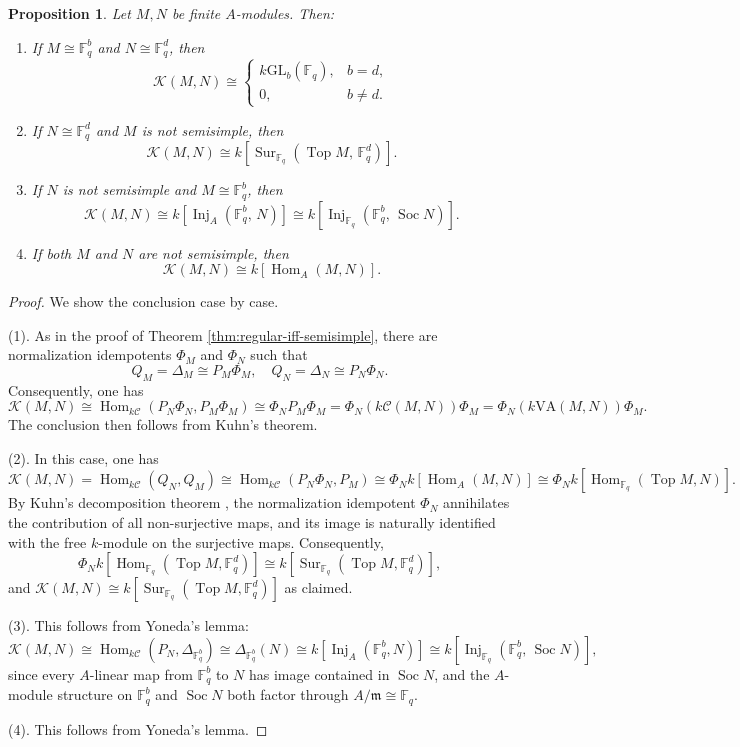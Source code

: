 \documentclass[10pt, reqno]{amsart}
\theoremstyle{plain}
\newtheorem{proposition}[theorem]{Proposition}
\numberwithin{equation}{section}
\theoremstyle{definition}
\newcommand{\Hom}{\operatorname{Hom}}
\newcommand{\Inj}{\operatorname{Inj}}
\newcommand{\Sur}{\operatorname{Sur}}
\newcommand{\Soc}{\operatorname{Soc}}
\newcommand{\Top}{\operatorname{Top}}
\newcommand{\C}{\mathscr C}
\newcommand{\K}{\mathcal K}
\begin{document}
\begin{proposition}\label{prop:four-blocks}
Let $M, N$ be finite $A$-modules. Then:
\begin{enumerate}
\item If $M \cong \mathbb{F}_q^b$ and $N \cong \mathbb{F}_q^d$, then
\[
\K(M, N) \cong
\begin{cases}
k\mathrm{GL}_b(\mathbb{F}_q),& b = d,\\
0, & b \neq d.
\end{cases}
\]
\item If $N \cong \mathbb{F}_q^d$ and $M$ is not semisimple, then
\[
\K(M, N) \cong k[\Sur_{\mathbb{F}_q} (\Top M, \, \mathbb{F}_q^d)].
\]
\item If $N$ is not semisimple and $M \cong \mathbb{F}_q^b$, then
\[
\K(M, N) \cong k[\Inj_A(\mathbb{F}_q^b, \, N)] \cong k[\Inj_{\mathbb{F}_q} (\mathbb{F}_q^b, \, \Soc N)].
\]
\item If both $M$ and $N$ are not semisimple, then
\[
\K(M, N) \cong k[\Hom_A(M, N)].
\]
\end{enumerate}
\end{proposition}

\begin{proof}
We show the conclusion case by case.

\medskip
\noindent
(1). As in the proof of Theorem \ref{thm:regular-iff-semisimple}, there are normalization idempotents $\Phi_M$ and $\Phi_N$ such that
\[
Q_M = \Delta_M \cong P_M \Phi_M, \quad Q_N = \Delta_N \cong P_N \Phi_N.
\]
Consequently, one has
\[
\K(M, N) \cong \Hom_{k\C} (P_N \Phi_N, P_M \Phi_M) \cong \Phi_N P_M \Phi_M = \Phi_N (k\C(M, N)) \Phi_M = \Phi_N (k\mathrm{VA} (M, N)) \Phi_M.
\]
The conclusion then follows from Kuhn's theorem.

\medskip
\noindent
(2). In this case, one has
\[
\K(M, N) = \Hom_{k\C} (Q_N, Q_M) \cong \Hom_{k\C}(P_N\Phi_N, P_M) \cong \Phi_N k[\Hom_A(M, N)] \cong \Phi_N k[\Hom_{\mathbb F_q}(\Top M, N)].
\]
By Kuhn's decomposition theorem \cite{Kuhn}, the normalization idempotent $\Phi_N$ annihilates the contribution of all non-surjective maps, and its image is naturally identified with the free $k$-module on the surjective maps. Consequently,
\[
\Phi_N k[\Hom_{\mathbb F_q}(\Top M,\mathbb F_q^d)] \cong k[\Sur_{\mathbb F_q}(\Top M,\mathbb F_q^d)],
\]
and $\K(M,N) \cong k[\Sur_{\mathbb F_q}(\Top M,\mathbb F_q^d)]$ as claimed.

\medskip
\noindent
(3). This follows from Yoneda's lemma:
\[
\K(M, N) \cong \Hom_{k\C}(P_N, \Delta_{\mathbb{F}_q^b}) \cong \Delta_{\mathbb{F}_q^b}(N) \cong k[\Inj_A(\mathbb{F}_q^b,N)] \cong k[\Inj_{\mathbb{F}_q} (\mathbb{F}_q^b, \, \Soc N)],
\]
since every $A$-linear map from $\mathbb{F}_q^b$ to $N$ has image contained in $\Soc N$, and the $A$-module structure on $\mathbb{F}_q^b$ and $\Soc N$ both factor through $A/\mathfrak{m} \cong \mathbb{F}_q$.

\medskip
\noindent
(4). This follows from Yoneda's lemma.
\end{proof}
\end{document}
